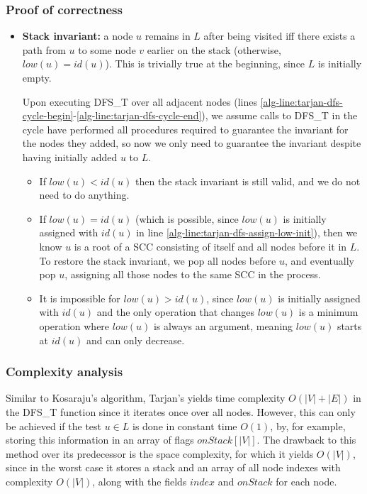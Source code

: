 \subsubsection{Proof of correctness}
\begin{itemize}
    \item \textbf{Stack invariant:} a node $u$ remains in $L$ after being visited iff there exists a path from $u$ to some node $v$ earlier on the stack (otherwise, $low(u)=id(u)$). This is trivially true at the beginning, since $L$ is initially empty.\par
    Upon executing \textsc{DFS\_T} over all adjacent nodes (lines \ref*{alg-line:tarjan-dfs-cycle-begin}-\ref*{alg-line:tarjan-dfs-cycle-end}), we assume calls to \textsc{DFS\_T} in the cycle have performed all procedures required to guarantee the invariant for the nodes they added, so now we only need to guarantee the invariant despite having initially added $u$ to $L$.
    \begin{itemize}
        \item If $low(u) < id(u)$ then the stack invariant is still valid, and we do not need to do anything.
        \item If $low(u)=id(u)$ (which is possible, since $low(u)$ is initially assigned with $id(u)$ in line \ref{alg-line:tarjan-dfs-assign-low-init}), then we know $u$ is a root of a \acrshort*{SCC} consisting of itself and all nodes before it in $L$. To restore the stack invariant, we pop all nodes before $u$, and eventually pop $u$, assigning all those nodes to the same \acrshort*{SCC} in the process.
        \item It is impossible for $low(u) > id(u)$, since $low(u)$ is initially assigned with $id(u)$ and the only operation that changes $low(u)$ is a minimum operation where $low(u)$ is always an argument, meaning $low(u)$ starts at $id(u)$ and can only decrease.
    \end{itemize}
\end{itemize}
\subsubsection{Complexity analysis}
Similar to Kosaraju's algorithm, Tarjan's yields time complexity $O(|V|+|E|)$ in the \textsc{DFS\_T} function since it iterates once over all nodes. However, this can only be achieved if the test $u \in L$ is done in constant time $O(1)$, by, for example, storing this information in an array of flags $onStack[|V|]$.
The drawback to this method over its predecessor is the space complexity, for which it yields $O(|V|)$, since in the worst case it stores a stack and an array of all node indexes with complexity $O(|V|)$, along with the fields $index$ and $onStack$ for each node. 